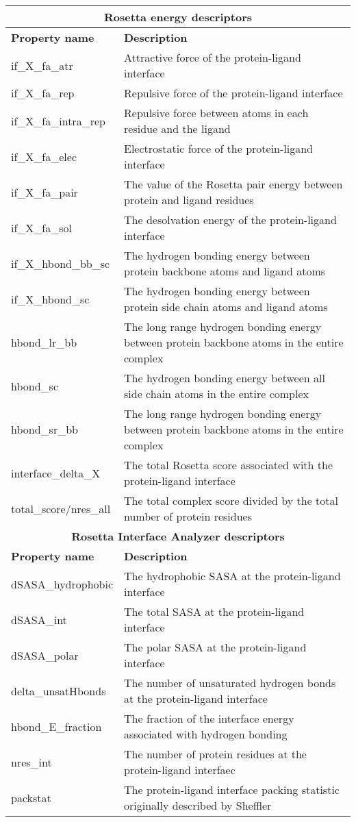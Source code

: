 \begin{tabular}{|l|l|}
\hline
\multicolumn{2}{|c|}{\textbf{Rosetta energy descriptors}} \\
\hline
\textbf{Property name} & \textbf{Description} \\
\hline
\hline
if\_X\_fa\_atr & Attractive force of the protein-ligand interface\\
\hline
if\_X\_fa\_rep & Repulsive force of the protein-ligand interface\\
\hline
if\_X\_fa\_intra\_rep & Repulsive force between atoms in each residue and the ligand \\
\hline
if\_X\_fa\_elec & Electrostatic force of the protein-ligand interface \\
\hline
if\_X\_fa\_pair & The value of the Rosetta pair energy between protein and ligand residues\\
\hline
if\_X\_fa\_sol & The desolvation energy of the protein-ligand interface \\
\hline
if\_X\_hbond\_bb\_sc & The hydrogen bonding energy between protein backbone atoms and ligand atoms \\
\hline
if\_X\_hbond\_sc & The hydrogen bonding energy between protein side chain atoms and ligand atoms \\
\hline
hbond\_lr\_bb & The long range hydrogen bonding energy between protein backbone atoms in the entire complex \\
\hline
hbond\_sc & The hydrogen bonding energy between all side chain atoms in the entire complex\\
\hline
hbond\_sr\_bb &  The long range hydrogen bonding energy between protein backbone atoms in the entire complex\\
\hline
interface\_delta\_X & The total Rosetta score associated with the protein-ligand interface\\
\hline
total\_score/nres\_all & The total complex score divided by the total number of protein residues \\
\hline
\multicolumn{2}{|c|}{\textbf{Rosetta Interface Analyzer descriptors}} \\
\hline
\textbf{Property name} & \textbf{Description} \\
\hline
\hline
dSASA\_hydrophobic & The hydrophobic SASA at the protein-ligand interface  \\
\hline
dSASA\_int & The total SASA at the protein-ligand interface  \\
\hline
dSASA\_polar & The polar SASA at the protein-ligand interface \\
\hline
delta\_unsatHbonds & The number of unsaturated hydrogen bonds at the protein-ligand interface\\
\hline
hbond\_E\_fraction & The fraction of the interface energy associated with hydrogen bonding\\
\hline
nres\_int & The number of protein residues at the protein-ligand interfaec\\
\hline
packstat & The protein-ligand interface packing statistic originally described by Sheffler \citep{Sheffler:2009bd} \\
\hline
\end{tabular}